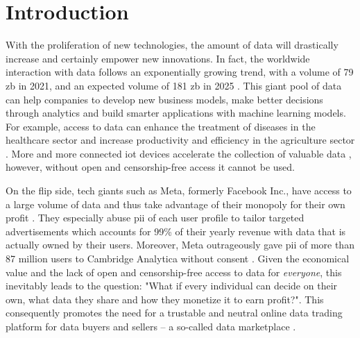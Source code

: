 \chapter{Introduction}
\label{cha:introduction}

With the proliferation of new technologies, the amount of data will drastically increase and certainly empower new innovations. In fact, the worldwide interaction with data follows an exponentially growing trend, with a volume of 79 \acrfull{zb} in 2021, and an expected volume of 181 \acrshort{zb} in 2025 \cite{statistaDataWorldWide}. This giant pool of data can help companies to develop new business models, make better decisions through analytics and build smarter applications with machine learning models. For example, access to data can enhance the treatment of diseases in the healthcare sector \cite{koutsosAgoraPrivacyAwareData,wangBigDataAnalytics2018,suBDTFBlockchainBasedData2020} and increase productivity and efficiency in the agriculture sector \cite{elijahOverviewInternetThings2018}. More and more connected \acrfull{iot} devices accelerate the collection of valuable data \cite{ozyilmazIDMoBIoTData2018,lawrenzBlockchainTechnologyApproach2019}, however, without open and censorship-free access it cannot be used.

On the flip side, tech giants such as Meta, formerly Facebook Inc., have access to a large volume of data and thus take advantage of their monopoly for their own profit \cite{serranoPeertoPeerOwnershipPreservingData2021}. They especially abuse \acrfull{pii} of each user profile to tailor targeted advertisements which accounts for 99\% \cite{GlobalMetaAdvertising} of their yearly revenue \cite{arrategalanLargeScaleAnalysisUser2019} with data that is actually owned by their users. Moreover, Meta outrageously gave \acrshort{pii} of more than 87 million users to Cambridge Analytica without consent \cite{isaakUserDataPrivacy2018,xiaoPrivacyGuardEnforcingPrivate2020}. Given the economical value and the lack of open and censorship-free access to data for \emph{everyone}, this inevitably leads to the question: "What if every individual can decide on their own, what data they share and how they monetize it to earn profit?". This consequently promotes the need for a trustable and neutral online data trading platform for data buyers and sellers -- a so-called data marketplace \cite{dagevilleSnowflakeElasticData2016,krishnamachariI3IoTMarketplace2018}.

